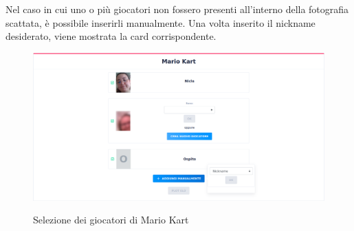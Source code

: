 		\noindent Nel caso in cui uno o più giocatori non fossero presenti all'interno della fotografia scattata, è possibile inserirli manualmente. Una volta inserito il nickname desiderato, viene mostrata la card corrispondente.
		
		\begin{figure}[H]
			\centering
			\includegraphics[width=\textwidth]{immagini/kart-2.png} \\
			\caption{\label{fig:kart-2} Selezione dei giocatori di Mario Kart}
		\end{figure}
	
		
